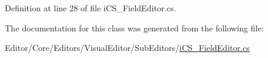 Definition at line 28 of file i\+C\+S\+\_\+\+Field\+Editor.\+cs.



The documentation for this class was generated from the following file\+:\begin{DoxyCompactItemize}
\item 
Editor/\+Core/\+Editors/\+Visual\+Editor/\+Sub\+Editors/\hyperlink{i_c_s___field_editor_8cs}{i\+C\+S\+\_\+\+Field\+Editor.\+cs}\end{DoxyCompactItemize}
